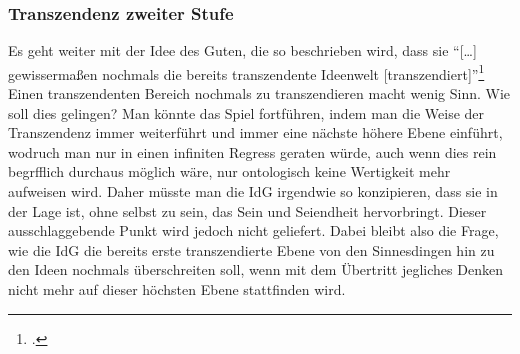 \subsubsection{Transzendenz zweiter Stufe}
Es geht weiter mit der Idee des Guten, die so beschrieben wird, dass sie \enquote{[\dots] gewissermaßen nochmals die bereits transzendente Ideenwelt [transzendiert]}\footcite[vgl.][S. 50]{DisseMetaphysik}
Einen transzendenten Bereich nochmals zu transzendieren macht wenig Sinn. Wie soll dies gelingen? 
Man könnte das Spiel fortführen, indem man die Weise der Transzendenz immer weiterführt und immer eine nächste höhere Ebene einführt, wodruch man nur in einen infiniten Regress geraten würde, auch wenn dies rein begrfflich durchaus möglich wäre, nur ontologisch keine Wertigkeit mehr aufweisen wird. Daher müsste man die IdG irgendwie so konzipieren, dass sie in der Lage ist, ohne selbst zu sein, das Sein und Seiendheit hervorbringt. Dieser ausschlaggebende Punkt wird jedoch nicht geliefert. Dabei bleibt also die Frage, wie die IdG die bereits erste transzendierte Ebene von den Sinnesdingen hin zu den Ideen nochmals überschreiten soll, wenn mit dem Übertritt jegliches Denken nicht mehr auf dieser höchsten Ebene stattfinden wird. 


